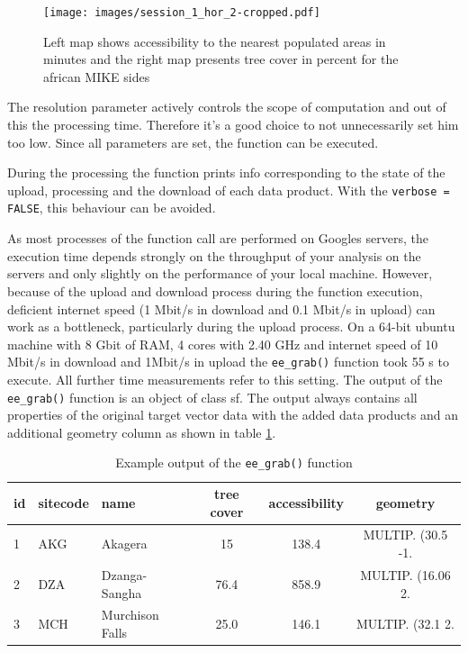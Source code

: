 \begin{center}
	\begin{figure}
		\begin{center}
			\texttt{[image: images/session\_1\_hor\_2-cropped.pdf]}
			\caption{Left map shows accessibility to the nearest populated areas in minutes and the right map presents tree cover in percent for the african MIKE sides}
			\label{sample_session_1}
		\end{center}
	\end{figure}
\end{center}

The resolution parameter actively controls the scope of computation and out of this the processing time. Therefore it's a good choice to not unnecessarily set him too low. 
Since all parameters are set, the function can be executed. 



During the processing the function prints info corresponding to the state of the upload, processing and the download of each data product. With the \texttt{verbose = FALSE}, this behaviour can be avoided. 





As most processes of the function call are performed on Googles servers, the execution time depends strongly on the throughput of your analysis on the servers and only slightly on the performance of your local machine. However, because of the upload and download process during the function execution, deficient internet speed (1 Mbit/s in download and 0.1 Mbit/s in upload) can work as a bottleneck, particularly during the upload process. 
On a 64-bit ubuntu machine with 8 Gbit of RAM, 4 cores with 2.40 GHz and internet speed of 10 Mbit/s in download and 1Mbit/s in upload the \texttt{ee\_grab()} function took 55 s to execute. All further time measurements refer to this setting.
The output of the \texttt{ee\_grab()} function is an object of class sf.  The output always contains all properties of the original target vector data with the added data products and an additional geometry column as shown in table \ref{output}.

\begin{table}[h]
	\begin{tabularx}{\textwidth}{|l|l|l|c|c|c|}
		\hline
		id & sitecode & name & tree cover & accessibility & geometry \\
		\hline
		1  & AKG  & Akagera & 15 & 138.4 & MULTIP. (30.5 -1.\\
		2 & DZA  & Dzanga-Sangha & 76.4 & 858.9 & MULTIP. (16.06 2.\\
		3 & MCH  & Murchison Falls & 25.0 & 146.1 & MULTIP. (32.1 2.\\
		
		\hline
	\end{tabularx}
	\caption{Example output of the \texttt{ee\_grab()} function}
	\label{output}
\end{table}



